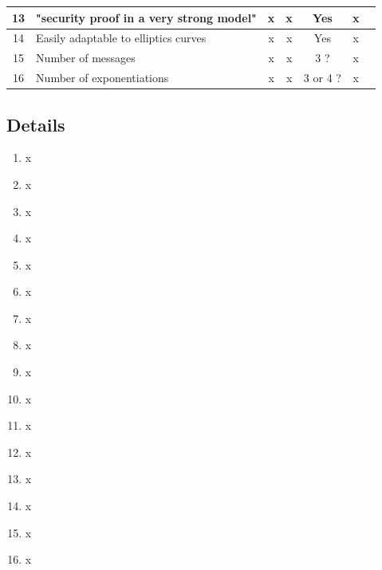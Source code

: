 \documentclass[../report.tex]{subfiles}
\begin{document}
\begin{center}
\begin{tabular}{ | c | p{8cm} || c | c | c | c | c | }
     13 & "security proof in a very strong model" & x & x & Yes & x \\ \hline
     
     
     14 & Easily adaptable to elliptics curves & x & x & Yes & x \\ \hline
     15 & Number of messages & x & x & 3 ? & x \\ \hline
     16 & Number of exponentiations & x & x & 3 or 4 ? & x \\ \hline

     \end{tabular}
 \end{center}
 
\subsection{Details} \label{sec:comparison_details}

\begin{enumerate}
 \item x
 \item x
 \item x
 \item x
 \item x
 \item x
 \item x
 \item x
 \item x
 \item x
 \item x
 \item x
 \item x
 \item x
 \item x
 \item x
\end{enumerate}
\end{document}
